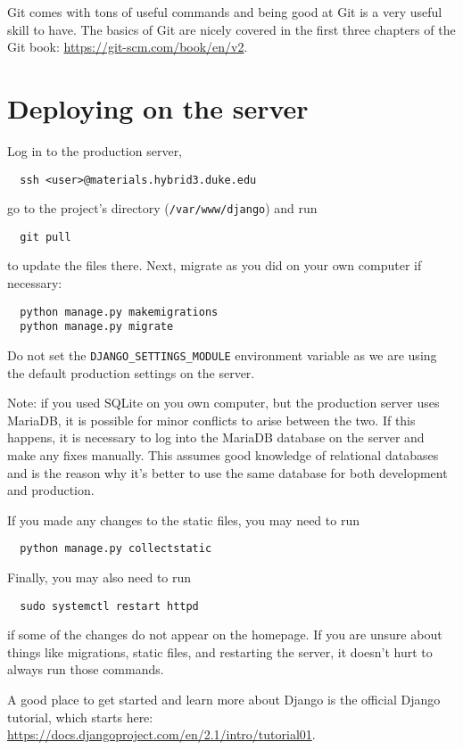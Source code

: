 \documentclass{article}
\begin{document}
Git comes with tons of useful commands and being good at Git is a very useful skill to have. The basics of Git are nicely covered in the first three chapters of the Git book: \url{https://git-scm.com/book/en/v2}.

\section{Deploying on the server}

Log in to the production server,
\begin{lstlisting}
  ssh <user>@materials.hybrid3.duke.edu
\end{lstlisting}
go to the project's directory (\verb+/var/www/django+) and run
\begin{lstlisting}
  git pull
\end{lstlisting}
to update the files there. Next, migrate as you did on your own computer if necessary:
\begin{lstlisting}
  python manage.py makemigrations
  python manage.py migrate
\end{lstlisting}
Do not set the \verb+DJANGO_SETTINGS_MODULE+ environment variable as we are using the default production settings on the server.

Note: if you used SQLite on you own computer, but the production server uses MariaDB, it is possible for minor conflicts to arise between the two. If this happens, it is necessary to log into the MariaDB database on the server and make any fixes manually. This assumes good knowledge of relational databases and is the reason why it's better to use the same database for both development and production.

If you made any changes to the static files, you may need to run
\begin{lstlisting}
  python manage.py collectstatic
\end{lstlisting}
Finally, you may also need to run
\begin{lstlisting}
  sudo systemctl restart httpd
\end{lstlisting}
if some of the changes do not appear on the homepage. If you are unsure about things like migrations, static files, and restarting the server, it doesn't hurt to always run those commands.

A good place to get started and learn more about Django is the official Django tutorial, which starts here: \url{https://docs.djangoproject.com/en/2.1/intro/tutorial01}.
\end{document}
